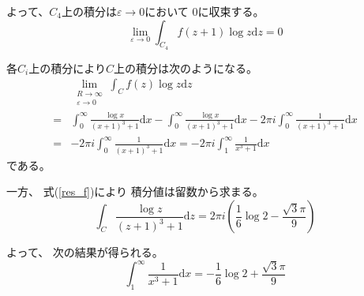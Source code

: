 \documentclass[12pt,b5paper]{ltjsarticle}
\begin{document}
よって、$C_4$上の積分は$\varepsilon\to0$において
$0$に収束する。
\begin{equation}
 \lim_{\varepsilon\to 0}\int_{C_4}f(z+1)\log{z}\mathrm{d}z=0
\end{equation}

各$C_{i}$上の積分により$C$上の積分は次のようになる。
\begin{align}
 & \lim_{ \substack{R\to\infty \\ \varepsilon\to 0} }\int_{C} f(z)\log{z}\mathrm{d}z \\
  = &
 \int_{0}^{\infty} \frac{\log{x}}{(x+1)^3+1}\mathrm{d}x
 -\int_{0}^{\infty} \frac{ \log{x} }{(x+1)^3 +1}\mathrm{d}x
 - 2\pi i\int_{0}^{\infty} \frac{ 1 }{(x+1)^3 +1}\mathrm{d}x \\
 =& - 2\pi i\int_{0}^{\infty} \frac{ 1 }{(x+1)^3 +1}\mathrm{d}x
 = - 2\pi i\int_{1}^{\infty} \frac{ 1 }{x^3 +1}\mathrm{d}x
\end{align}
である。


一方、
式(\ref{res_f})により
積分値は留数から求まる。
\begin{equation}
 \int_{C} \frac{\log{z}}{(z+1)^3+1}\mathrm{d}z
 = 2\pi i \left(
     \frac{1}{6}\log{2} - \frac{\sqrt{3}\pi}{9}
  \right)
\end{equation}

よって、
次の結果が得られる。
\begin{equation}
  \int_{1}^{\infty} \frac{ 1 }{x^3 +1}\mathrm{d}x
 = - \frac{1}{6}\log{2} + \frac{\sqrt{3}\pi}{9}
\end{equation}


\hrulefill
\end{document}
